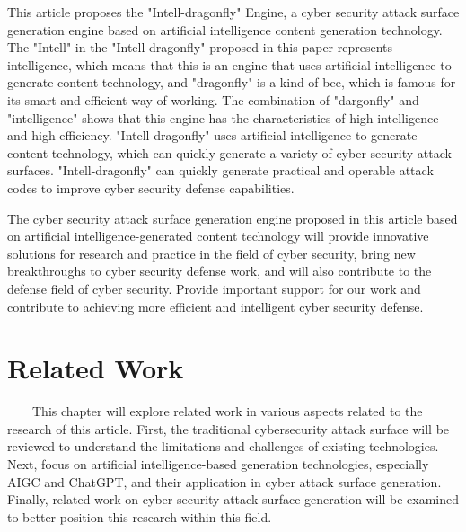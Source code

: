 \documentclass[runningheads]{llncs}
\begin{document}
%
This article proposes the "Intell-dragonfly" Engine, a cyber security attack surface generation engine based on artificial intelligence content generation technology. The "Intell" in the "Intell-dragonfly" proposed in this paper represents intelligence, which means that this is an engine that uses artificial intelligence to generate content technology, and "dragonfly" is a kind of bee, which is famous for its smart and efficient way of working. The combination of "dargonfly" and "intelligence" shows that this engine has the characteristics of high intelligence and high efficiency. "Intell-dragonfly" uses artificial intelligence to generate content technology, which can quickly generate a variety of cyber security attack surfaces. "Intell-dragonfly" can quickly generate practical and operable attack codes to improve cyber security defense capabilities.\par
%
The cyber security attack surface generation engine proposed in this article based on artificial intelligence-generated content technology will provide innovative solutions for research and practice in the field of cyber security, bring new breakthroughs to cyber security defense work, and will also contribute to the defense field of cyber security. Provide important support for our work and contribute to achieving more efficient and intelligent cyber security defense.

\section{Related Work}
\ \ \ \ This chapter will explore related work in various aspects related to the research of this article. First, the traditional cybersecurity attack surface will be reviewed to understand the limitations and challenges of existing technologies. Next, focus on artificial intelligence-based generation technologies, especially AIGC and ChatGPT, and their application in cyber attack surface generation. Finally, related work on cyber security attack surface generation will be examined to better position this research within this field.
\end{document}

